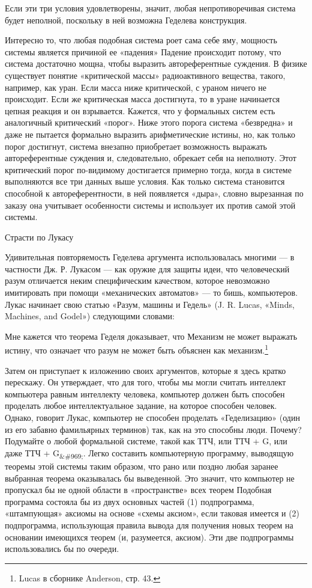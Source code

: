 Если эти три условия удовлетворены, значит, любая непротиворечивая система будет неполной, поскольку в ней возможна Геделева конструкция.

Интересно то, что любая подобная система роет сама себе яму, мощность системы является причиной ее «падения» Падение происходит потому, что система достаточно мощна, чтобы выразить автореферентные суждения. В физике существует понятие «критической массы» радиоактивного вещества, такого, например, как уран. Если масса ниже критической, с ураном ничего не происходит. Если же критическая масса достигнута, то в уране начинается цепная реакция и он взрывается. Кажется, что у формальных систем есть аналогичный критический «порог». Ниже этого порога система «безвредна» и даже не пытается формально выразить арифметические истины, но, как только порог достигнут, система внезапно приобретает возможность выражать автореферентные суждения и, следовательно, обрекает себя на неполноту. Этот критический порог по-видимому достигается примерно тогда, когда в системе выполняются все три данных выше условия. Как только система становится способной к автореферентности, в ней появляется «дыра», словно вырезанная по заказу она учитывает особенности системы и использует их против самой этой системы.

Страсти по Лукасу

Удивительная повторяемость Геделева аргумента использовалась многими --- в частности Дж. Р. Лукасом --- как оружие для защиты идеи, что человеческий разум отличается неким специфическим качеством, которое невозможно имитировать при помощи «механических автоматов» --- то бишь, компьютеров. Лукас начинает свою статью «Разум, машины и Гедель» (J. R. Lucas, «Minds, Machines, and Godel») следующими словами:

Мне кажется что теорема Геделя доказывает, что Механизм не может выражать истину, что означает что разум не может быть объяснен как механизм.\footnote{Lucas в сборнике Anderson, стр. 43.}

Затем он приступает к изложению своих аргументов, которые я здесь кратко перескажу. Он утверждает, что для того, чтобы мы могли считать интеллект компьютера равным интеллекту человека, компьютер должен быть способен проделать любое интеллектуальное задание, на которое способен человек. Однако, говорит Лукас, компьютер не способен проделать «Геделизацию» (один из его забавно фамильярных терминов) так, как на это способны люди. Почему? Подумайте о любой формальной системе, такой как ТТЧ, или ТТЧ + G, или даже ТТЧ + G\textsubscript{\&\#969;}. Легко составить компьютерную программу, выводящую теоремы этой системы таким образом, что рано или поздно любая заранее выбранная теорема оказывалась бы выведенной. Это значит, что компьютер не пропускал бы не одной области в «пространстве» всех теорем Подобная программа состояла бы из двух основных частей (1) подпрограмма, «штампующая» аксиомы на основе «схемы аксиом», если таковая имеется и (2) подпрограмма, использующая правила вывода для получения новых теорем на основании имеющихся теорем (и, разумеется, аксиом). Эти две подпрограммы использовались бы по очереди.

